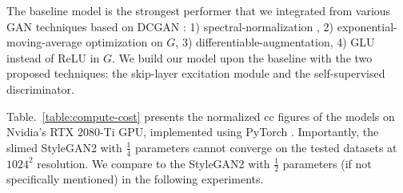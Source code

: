 \documentclass{article} \usepackage{iclr2021_conference,times}
\begin{document}
The baseline model is the strongest performer that we integrated from various GAN techniques based on DCGAN \citep{radford2015unsupervised}: 1) spectral-normalization \citep{miyato2018spectral}, 2) exponential-moving-average \citep{yazici2018unusual} optimization on $G$, 3) differentiable-augmentation, 4) GLU \citep{dauphin2017language} instead of ReLU in $G$. We build our model upon the baseline with the two proposed techniques: the skip-layer excitation module and the self-supervised discriminator. 

\begin{table}[h]
\caption{Computational cost comparison of the models.}
\label{table:compute-cost}
\begin{center}
\end{center}
\end{table}

Table.~\ref{table:compute-cost} presents the normalized cc figures of the models on Nvidia's RTX 2080-Ti GPU, implemented using PyTorch \citep{paszke2017automatic}. Importantly, the slimed StyleGAN2 with $\frac{1}{4}$ parameters cannot converge on the tested datasets at $1024^2$ resolution. We compare to the StyleGAN2 with $\frac{1}{2}$ parameters (if not specifically mentioned) in the following experiments.
\end{document}
